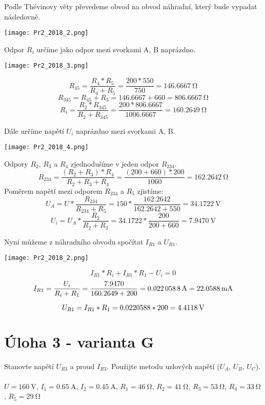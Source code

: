\documentclass[11pt]{article}
\begin{document}
Podle Thévinovy věty převedeme obvod na obvod náhradní, který bude vypadat následovně.

\begin{center}
	\texttt{[image: Pr2\_2018\_2.png]} 
\end{center}

Odpor \(R_i\) určíme jako odpor mezi svorkami A, B naprázdno.

\begin{center}
	\texttt{[image: Pr2\_2018\_3.png]} 
\end{center}

\[R_{45} = \frac{R_4 * R_5}{R_4 + R_5} = \frac{200 * 550}{750} = \SI{146.6667}{\ohm}\]
\[R_{345} = R_{45} + R_3 = 146.6667 + 660 = \SI{806.6667}{\ohm} \]
\[R_i = \frac{R_2 * R_{345}}{R_2 + R_{345}} = \frac{200 * 806.6667}{1006.6667} = \SI{160.2649}{\ohm} \]

Dále určíme napětí \(U_i\) naprázdno mezi svorkami A, B.

\begin{center}
	\texttt{[image: Pr2\_2018\_4.png]} 
\end{center}

Odpory \(R_2\), \(R_3\) a \(R_4\) zjednodušíme v jeden odpor \(R_{234}\). 
\[R_{234} = \frac{(R_2 + R_3) * R_4}{R_2 + R_3 + R_4} = \frac{(200 + 660) * 200}{1060} = \SI{162.2642}{\ohm} \]
Poměrem napětí mezi odporem \(R_{234}\) a \(R_5\) zjistíme:
\[U_A = U * \frac{R_{234}}{R_{234} + R_5} = 150 * \frac{162.2642}{162.2642 + 550} = \SI{34.1722}{\volt} \]
\[U_i = U_A * \frac{R_2}{R_2 + R_3} = 34.1722 * \frac{200}{200 + 660} = \SI{7.9470}{\volt} \]



Nyní můžeme z náhradního obvodu spočítat \(I_{R1}\) a \(U_{R1}\).

\begin{center}
	\texttt{[image: Pr2\_2018\_2.png]} 
\end{center}

\[I_{R1}*R_i + I_{R1} * R_1 - U_i = 0 \]
\[I_{R1} = \frac{U_i}{R_i + R_1} = \frac{7.9470}{160.2649 + 200} = \SI{0.0220588}{\ampere} = \textbf{\SI{22.0588}{\milli\ampere}} \]

\[U_{R1} = I_{R1} * R_1 = 0.0220588 * 200 = \textbf{\SI{4.4118}{\volt}} \]
\newpage

\section{Úloha 3 - varianta G}
Stanovte napětí \(U_{R3}\) a proud \(I_{R3}\). Použijte metodu uzlových napětí (\(U_A\), \(U_B\), \(U_C\)).
\\
\\
\(U = \SI{160}{\volt}\),
\(I_1 = \SI{0.65}{\ampere}\),
\(I_2 = \SI{0.45}{\ampere}\),
\(R_1 = \SI{46}{\ohm}\),
\(R_2 = \SI{41}{\ohm}\),
\(R_3 = \SI{53}{\ohm}\),
\(R_4 = \SI{33}{\ohm}\),
\(R_5 = \SI{29}{\ohm}\)
\end{document}
